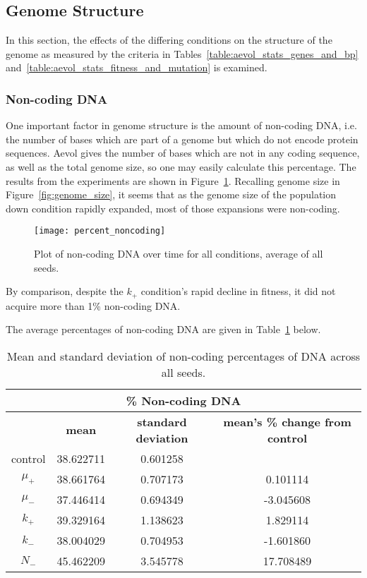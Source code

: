 \subsection{Genome Structure}
In this section, the effects of the differing conditions on the structure of the genome as measured by the criteria in Tables~\ref{table:aevol_stats_genes_and_bp} and~\ref{table:aevol_stats_fitness_and_mutation} is examined. 

\subsubsection{Non-coding DNA}
One important factor in genome structure is the amount of non-coding DNA, i.e. the number of bases which are part of a genome but which do not encode protein sequences. Aevol gives the number of bases which are not in any coding sequence, as well as the total genome size, so one may easily calculate this percentage. The results from the experiments are shown in Figure~\ref{fig:mean_non-coding_DNA}. Recalling genome size in Figure~\ref{fig:genome_size}, it seems that as the genome size of the population down condition rapidly expanded, most of those expansions were non-coding.
\begin{figure}[H]
	\centering
	\texttt{[image: percent\_noncoding]}
	\caption[Non-coding DNA]{Plot of non-coding DNA over time for all conditions, average of all seeds.}
	\label{fig:mean_non-coding_DNA}
\end{figure}
By comparison, despite the $k_+$ condition's rapid decline in fitness, it did not acquire more than 1\% non-coding DNA. 

The average percentages of non-coding DNA are given in Table~\ref{table:non-coding_DNA_mean_and_standard_deviation} below. 
\begin{table}[H]
	\begin{tabular}{|c|c|c|c|}
		\hline
		\multicolumn{4}{c}{\Large \textbf{\% Non-coding DNA}} \\
		\hline
		& \textbf{mean} & \textbf{standard deviation} & \textbf{mean's \% change from control} \\
		\hline \hline
		control & 38.622711 & 0.601258 & \textemdash \\ 
		\hline
		$\mu_+$ & 38.661764 & 0.707173 & 0.101114 \\ 
		\hline
		$\mu_-$ & 37.446414 & 0.694349 & -3.045608 \\ 
		\hline
		$k_+$ & 39.329164 & 1.138623 & 1.829114 \\ 
		\hline
		$k_-$ & 38.004029 & 0.704953 & -1.601860 \\ 
		\hline
		$N_-$ & 45.462209 & 3.545778 & 17.708489 \\ 
		\hline
	\end{tabular}
	\caption[Non-coding DNA mean and standard deviation]{Mean and standard deviation of non-coding percentages of DNA across all seeds.}
	\label{table:non-coding_DNA_mean_and_standard_deviation}
\end{table}

